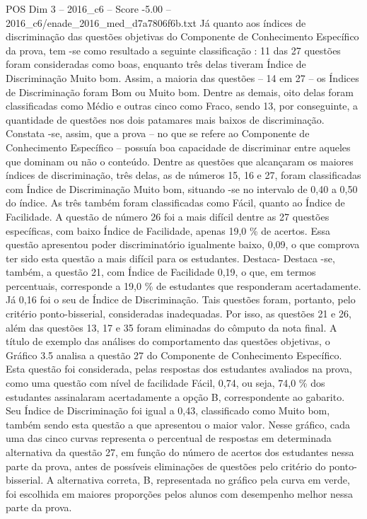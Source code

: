 \begin{textsample}{POS Dim 3 – 2016\_c6 – Score -5.00 – 2016\_c6/enade\_2016\_med\_d7a7806f6b.txt}
Já quanto aos índices de discriminação das questões objetivas do Componente de Conhecimento Específico da prova, tem -se como resultado a seguinte classificação : 11 das 27 questões foram consideradas como boas, enquanto três delas tiveram Índice de Discriminação Muito bom.
Assim, a maioria das questões – 14 em 27 – os Índices de Discriminação foram Bom ou Muito bom.
Dentre as demais, oito delas foram classificadas como Médio e outras cinco como Fraco, sendo 13, por conseguinte, a quantidade de questões nos dois patamares mais baixos de discriminação.
Constata -se, assim, que a prova – no que se refere ao Componente de Conhecimento Específico – possuía boa capacidade de discriminar entre aqueles que dominam ou não o conteúdo.
Dentre as questões que alcançaram os maiores índices de discriminação, três delas, as de números 15, 16 e 27, foram classificadas com Índice de Discriminação Muito bom, situando -se no intervalo de 0,40 a 0,50 do índice.
As três também foram classificadas como Fácil, quanto ao Índice de Facilidade.
A questão de número 26 foi a mais difícil dentre as 27 questões específicas, com baixo Índice de Facilidade, apenas 19,0 \% de acertos.
Essa questão apresentou poder discriminatório igualmente baixo, 0,09, o que comprova ter sido esta questão a mais difícil para os estudantes.
Destaca- Destaca -se, também, a questão 21, com Índice de Facilidade 0,19, o que, em termos percentuais, corresponde a 19,0 \% de estudantes que responderam acertadamente.
Já 0,16 foi o seu de Índice de Discriminação.
Tais questões foram, portanto, pelo critério ponto-bisserial, consideradas inadequadas.
Por isso, as questões 21 e 26, além das questões 13, 17 e 35 foram eliminadas do cômputo da nota final.
A título de exemplo das análises do comportamento das questões objetivas, o Gráfico 3.5 analisa a questão 27 do Componente de Conhecimento Específico.
Esta questão foi considerada, pelas respostas dos estudantes avaliados na prova, como uma questão com nível de facilidade Fácil, 0,74, ou seja, 74,0 \% dos estudantes assinalaram acertadamente a opção B, correspondente ao gabarito.
Seu Índice de Discriminação foi igual a 0,43, classificado como Muito bom, também sendo esta questão a que apresentou o maior valor.
Nesse gráfico, cada uma das cinco curvas representa o percentual de respostas em determinada alternativa da questão 27, em função do número de acertos dos estudantes nessa parte da prova, antes de possíveis eliminações de questões pelo critério do ponto-bisserial.
A alternativa correta, B, representada no gráfico pela curva em verde, foi escolhida em maiores proporções pelos alunos com desempenho melhor nessa parte da prova.

\end{textsample}

